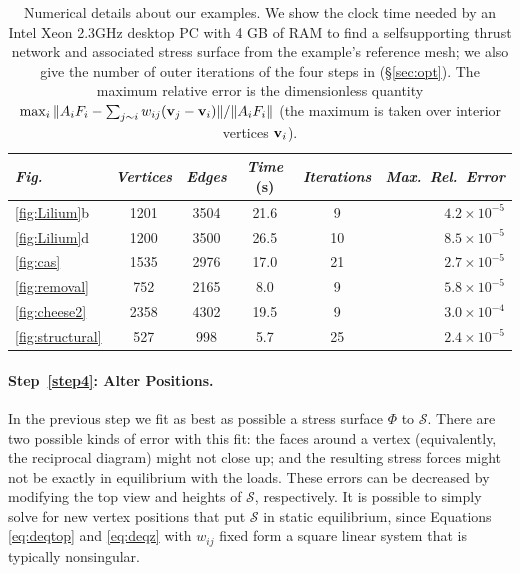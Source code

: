 \documentclass[review]{acmsiggraph}
\def\SS{{\mathcal S}}
\newcommand{\secref}[1]{(\S\ref{#1})}
\begin{document}
\begin{table}[t]
\begin{tabular}{@{}lccccr@{}}
		 \textit{Fig.}
		& \textit{Vertices}
		& \textit{Edges}
			& \textit{Time} (s)
			& \!\!\!\textit{Iterations} \!\!\!\!
			& \textit{Max.\ Rel.\ Error} \\
	\hline
		 \protect\ref{fig:Lilium}b
		& 1201
		& 3504
			& 21.6
			& 9
			& $4.2 \times 10^{-5}$
	\\ %
		 \protect\ref{fig:Lilium}d
		& 1200
		& 3500
			& 26.5
			& 10
			& $8.5 \times 10^{-5}$
	\\ %
		 \protect\ref{fig:cas}
		& 1535
		& 2976
			& 17.0
			& 21
			& $2.7\times 10^{-5}$
	\\ %
		 \protect\ref{fig:removal}
		& 752
		& 2165
			& 8.0
			& 9
			& $5.8 \times 10^{-5}$
	\\ %
		 \protect\ref{fig:cheese2}
		& 2358
		& 4302
			& 19.5
			& 9
			& $3.0 \times 10^{-4}$
	\\ %
		 \protect\ref{fig:structural}
		& 527
		& 998
			& 5.7
			& 25
			& $2.4\times 10^{-5}$
	\\ \hline
  \end{tabular}
	\caption{Numerical details about our examples.
We show the clock time needed by an Intel Xeon 2.3GHz
desktop PC with 4 GB of RAM to find a self\dash supporting thrust network and
associated stress surface from the example's reference mesh; we also give
the number of outer iterations of the four steps in \secref{sec:opt}. The
maximum relative error is the dimensionless quantity
$\max_i \| A_i F_i - \sum\nolimits_{j\sim i} w_{ij}
({\mathbf v}_j-{\mathbf v}_i) \|/\|A_i F_i\|$ (the maximum is
taken over interior vertices ${\mathbf v}_i$).}\label{table:data}

\end{table}

\paragraph{Step~\ref{step4}: Alter Positions.} In the previous step we fit
as best as possible a stress surface $\Phi$ to $\SS$. There are two
possible kinds of error with this fit: the faces around a vertex
(equivalently, the reciprocal diagram) might not close up; and the
resulting stress forces might not be exactly in equilibrium with the
loads. These errors can be decreased by modifying the top view and heights
of $\SS$, respectively. It is possible to simply solve for new vertex
positions that put $\SS$ in static equilibrium, since Equations
\eqref{eq:deqtop} and \eqref{eq:deqz} with $w_{ij}$ fixed form a square
linear system that is typically nonsingular.
\end{document}
